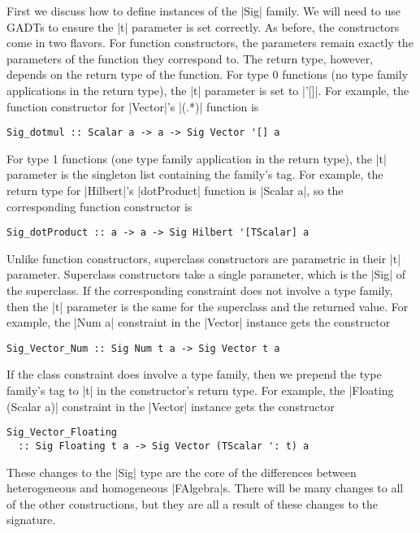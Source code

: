 \documentclass[preprint]{sigplanconf}
\theoremstyle{definition}
\begin{document}
First we discuss how to define instances of the |Sig| family.
We will need to use GADTs \cite{schrijvers2009complete} to ensure the |t| parameter is set correctly.
As before, the constructors come in two flavors.
For function constructors,
the parameters remain exactly the parameters of the function they correspond to.
The return type, however, depends on the return type of the function.
For type 0 functions (no type family applications in the return type),
the |t| parameter is set to |'[]|.
For example, the function constructor for |Vector|'s |(.*)| function is
\begin{lstlisting}
Sig_dotmul :: Scalar a -> a -> Sig Vector '[] a
\end{lstlisting}
For type 1 functions (one type family application in the return type),
the |t| parameter is the singleton list containing the family's tag.
For example, the return type for |Hilbert|'s |dotProduct| function is |Scalar a|,
so the corresponding function constructor is
\begin{lstlisting}
Sig_dotProduct :: a -> a -> Sig Hilbert '[TScalar] a
\end{lstlisting}
Unlike function constructors, superclass constructors are parametric in their |t| parameter.
Superclass constructors take a single parameter,
which is the |Sig| of the superclass.
If the corresponding constraint does not involve a type family,
then the |t| parameter is the same for the superclass and the returned value.
For example, the |Num a| constraint in the |Vector| instance gets the constructor
\begin{lstlisting}
Sig_Vector_Num :: Sig Num t a -> Sig Vector t a
\end{lstlisting}
If the class constraint does involve a type family,
then we prepend the type family's tag to |t| in the constructor's return type.
For example, the |Floating (Scalar a)| constraint in the |Vector| instance gets the constructor
\begin{lstlisting}
Sig_Vector_Floating
  :: Sig Floating t a -> Sig Vector (TScalar ': t) a
\end{lstlisting}
These changes to the |Sig| type are the core of the differences between heterogeneous and homogeneous |FAlgebra|s.
There will be many changes to all of the other constructions,
but they are all a result of these changes to the signature.
\end{document}

